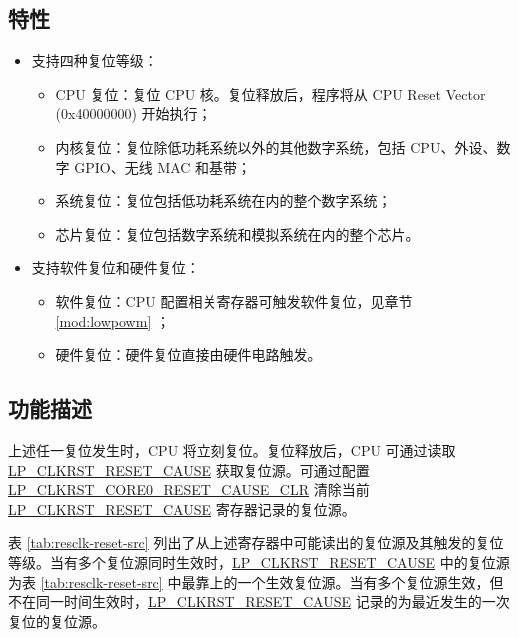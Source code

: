 \documentclass[main\_\_CN.tex]{subfiles}
\begin{document}
\subsection{特性}
\label{sec:resclk-features}
\begin{itemize}
    \item 支持四种复位等级：
    \begin{itemize}
    \item CPU 复位：复位 CPU 核。复位释放后，程序将从 CPU Reset Vector (0x40000000) 开始执行；
    \item 内核复位：复位除低功耗系统以外的其他数字系统，包括 CPU、外设、数字 GPIO、无线 MAC 和基带；
    \item 系统复位：复位包括低功耗系统在内的整个数字系统；
    \item 芯片复位：复位包括数字系统和模拟系统在内的整个芯片。
    \end{itemize}
    \item 支持软件复位和硬件复位：
    \begin{itemize}
        \item 软件复位：CPU 配置相关寄存器可触发软件复位，见章节 \ref{mod:lowpowm} \textit{}；
        \item 硬件复位：硬件复位直接由硬件电路触发。
    \end{itemize}
\end{itemize}

\subsection{功能描述}
上述任一复位发生时，CPU 将立刻复位。复位释放后，CPU 可通过读取 \hyperref[fielddesc:LPCLKRSTRESETCAUSE]{LP\_CLKRST\_RESET\_CAUSE} 获取复位源。可通过配置 \hyperref[fielddesc:LPCLKRSTCORE0RESETCAUSECLR]{LP\_CLKRST\_CORE0\_RESET\_CAUSE\_CLR} 清除当前 \hyperref[fielddesc:LPCLKRSTRESETCAUSE]{LP\_CLKRST\_RESET\_CAUSE} 寄存器记录的复位源。

表 \ref{tab:resclk-reset-src} 列出了从上述寄存器中可能读出的复位源及其触发的复位等级。当有多个复位源同时生效时，\hyperref[fielddesc:LPCLKRSTRESETCAUSE]{LP\_CLKRST\_RESET\_CAUSE} 中的复位源为表 \ref{tab:resclk-reset-src} 中最靠上的一个生效复位源。当有多个复位源生效，但不在同一时间生效时，\hyperref[fielddesc:LPCLKRSTRESETCAUSE]{LP\_CLKRST\_RESET\_CAUSE} 记录的为最近发生的一次复位的复位源。
\end{document}
